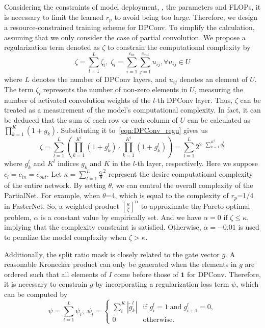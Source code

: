 Considering the constraints of model deployment, \eg, the parameters and FLOPs, it is necessary to limit the learned {\small $r_p$} to avoid being too large. Therefore, we design a resource-constrained training scheme for DPConv. To simplify the calculation, assuming that we only consider the case of partial convolution. We propose a regularization term denoted as {\small $\zeta$} to constrain the computational complexity by
{\small
\begin{equation} 
  \zeta = \sum_{l=1}^{L}\zeta_l,\; \zeta_l=\sum_{i=1}^{c_{in}}\sum_{j=1}^{c_{out}}u_{ij}, \forall u_{ij} \in U 
  \label{eqn:DPConv_regu}
\end{equation}
}
where {\small $L$} denotes the number of DPConv layers, and {\small $u_{ij}$} denotes an element of {\small $U$}. The term {\small $\zeta_l$} represents the number of non-zero elements in {\small $U$}, measuring the number of activated convolution weights of the {\small $l$}-th DPConv layer. Thus, {\small $\zeta$} can be treated as a measurement of the model's computational complexity. In fact, it can be deduced that the sum of each row or each column of {\small $U$} can be calculated as {\small $\prod_{k=1}^{K}(1+g_k)$}. Substituting it to~\cref{eqn:DPConv_regu} gives us
{\small
\begin{equation}
  \zeta = \sum_{l=1}^{L} (\prod_{k=1}^{K^l}(1+g_k^l) \cdot \prod_{k=1}^{K^l}(1+g_k^l) ) = \sum_{l=1}^{L} 2^{2\cdot \sum_{k=1}^{K^l}g_k^l}
\end{equation}
}
where {\small $g_k^l$} and {\small $K^l$} indices {\small $g_k$} and {\small $K$} in the {\small $l$}-th layer, respectively. Here we suppose {\small $c_l=c_{in}=c_{out}$}. Let {\small $\kappa=\sum_{l=1}^{L}{\frac{c_l}{\theta}}^2$} represent the desire computational complexity of the entire network. By setting $\theta$, we can control the overall complexity of the PartialNet. For example, when {\small $\theta$}=4, which is equal to the complexity of {\small $r_p$}=1/4 in FasterNet. So, a weighted product {\small $[\frac{\kappa}{\zeta}]^\alpha$} to approximate the Pareto optimal problem, {\small $\alpha$} is a constant value by empirically set. And we have {\small $\alpha=0$} if {\small $\zeta \le \kappa$}, implying that the complexity constraint is satisfied. Otherwise, {\small $\alpha=-0.01$} is used to penalize the model complexity when {\small $\zeta > \kappa$}.

Additionally, the split ratio mask is closely related to the gate vector {\small $g$}. A reasonable Kronecker product can only be generated when the elements in {\small $g$} are ordered such that all elements of {\small $I$} come before those of {\small $\mathbf{1}$} for DPConv. Therefore, it is necessary to constrain {\small $g$} by incorporating a regularization loss term {\small $\psi$}, which can be computed by
{\small
\begin{equation} 
  \psi = \sum_{l=1}^{L}\psi_l,\; \psi_l=
  \begin{cases}
      \sum_{i}^{K}\left|\widetilde{g}_k^l\right| & \text{if } g^l_i=1\; \text{and}\; g^l_{i+1}=0, \\
      0 & \text{otherwise}.
  \end{cases}
\end{equation} 
}

